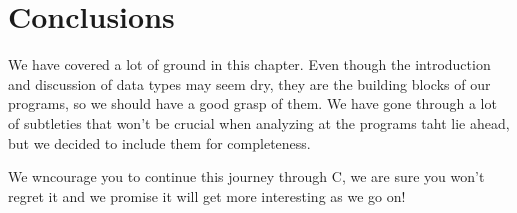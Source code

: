 \documentclass[12pt]{book}
\begin{document}
\section{Conclusions}

We have covered a lot of ground in this chapter. Even though the introduction and discussion of data types may seem dry, they are the building blocks of our programs, so we should have a good grasp of them. We have gone through a lot of subtleties that won't be crucial when analyzing at the programs taht lie ahead, but we decided to include them for completeness.

We wncourage you to continue this journey through C, we are sure you won't regret it and we promise it will get more interesting as we go on!
\end{document}
